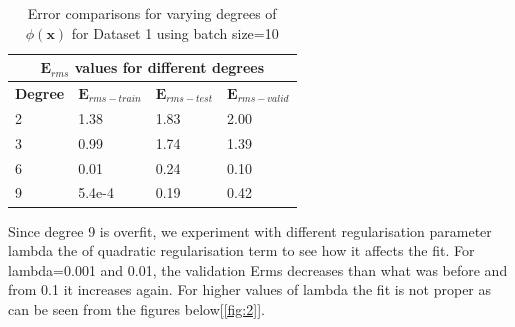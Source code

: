 {
\begin{table}[!ht]
\begin{tabular}{ |p{1.5cm}|p{3cm}|p{3cm}| p{3cm}|  }
\hline
\multicolumn{4}{|c|}{$\mathbf{E}_{rms}$ values for different degrees } \\
\hline
\rowcolor{lightgray} \textbf{Degree} & $\mathbf{E}_{rms-train}$ & $\mathbf{E}_{rms-test}$ & $\mathbf{E}_{rms-valid}$ \\
2   &   1.38  &  1.83   &  2.00   \\   
\hline
 3   &  0.99 &  1.74  &  1.39   \\   
 \hline
 6   &   0.01   &   0.24   &   0.10         \\
 \hline
 9   &   5.4e-4   &    0.19        &     0.42     \\
 \hline
\end{tabular}
\caption{Error comparisons for varying degrees of $\phi(\mathbf{x}) $ for Dataset 1 using batch size=10}
\label{table:1}
\end{table}
}


Since degree 9 is overfit, we experiment with different regularisation parameter lambda the of quadratic regularisation term to see how it affects the fit. For lambda=0.001 and 0.01, the validation Erms decreases than what was before and from 0.1 it increases again. For higher values of lambda the fit is not proper as can be seen from the figures below[\ref{fig:2}].

